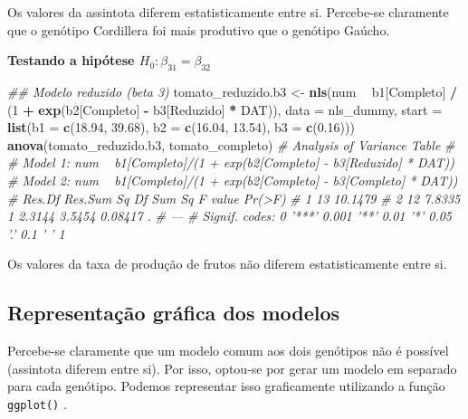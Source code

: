 \documentclass[
]{book}
\newenvironment{Shaded}{\begin{snugshade}}{\end{snugshade}}
\newcommand{\CommentTok}[1]{\textcolor[rgb]{0.56,0.35,0.01}{\textit{#1}}}
\newcommand{\DataTypeTok}[1]{\textcolor[rgb]{0.13,0.29,0.53}{#1}}
\newcommand{\DecValTok}[1]{\textcolor[rgb]{0.00,0.00,0.81}{#1}}
\newcommand{\FloatTok}[1]{\textcolor[rgb]{0.00,0.00,0.81}{#1}}
\newcommand{\KeywordTok}[1]{\textcolor[rgb]{0.13,0.29,0.53}{\textbf{#1}}}
\newcommand{\NormalTok}[1]{#1}
\newcommand{\OperatorTok}[1]{\textcolor[rgb]{0.81,0.36,0.00}{\textbf{#1}}}
\newcommand{\StringTok}[1]{\textcolor[rgb]{0.31,0.60,0.02}{#1}}
\begin{document}
Os valores da assintota diferem estatisticamente entre si. Percebe-se claramente que o genótipo Cordillera foi mais produtivo que o genótipo Gaúcho.

\textbf{Testando a hipótese \(H_0:\beta_{31} = \beta_{32}\)}

\begin{Shaded}
\begin{Highlighting}[]
\CommentTok{## Modelo reduzido (beta 3)}
\NormalTok{tomato_reduzido.b3 <-}\StringTok{ }
\StringTok{  }\KeywordTok{nls}\NormalTok{(num }\OperatorTok{~}\StringTok{ }\NormalTok{b1[Completo] }\OperatorTok{/}\StringTok{ }\NormalTok{(}\DecValTok{1} \OperatorTok{+}\StringTok{ }\KeywordTok{exp}\NormalTok{(b2[Completo] }\OperatorTok{-}\StringTok{ }\NormalTok{b3[Reduzido] }\OperatorTok{*}\StringTok{ }\NormalTok{DAT)), }
      \DataTypeTok{data =}\NormalTok{ nls_dummy,}
      \DataTypeTok{start =} \KeywordTok{list}\NormalTok{(}\DataTypeTok{b1 =} \KeywordTok{c}\NormalTok{(}\FloatTok{18.94}\NormalTok{, }\FloatTok{39.68}\NormalTok{),}
                   \DataTypeTok{b2 =} \KeywordTok{c}\NormalTok{(}\FloatTok{16.04}\NormalTok{, }\FloatTok{13.54}\NormalTok{),}
                   \DataTypeTok{b3 =} \KeywordTok{c}\NormalTok{(}\FloatTok{0.16}\NormalTok{)))}
\KeywordTok{anova}\NormalTok{(tomato_reduzido.b3, tomato_completo)}
\CommentTok{# Analysis of Variance Table}
\CommentTok{# }
\CommentTok{# Model 1: num ~ b1[Completo]/(1 + exp(b2[Completo] - b3[Reduzido] * DAT))}
\CommentTok{# Model 2: num ~ b1[Completo]/(1 + exp(b2[Completo] - b3[Completo] * DAT))}
\CommentTok{#   Res.Df Res.Sum Sq Df Sum Sq F value  Pr(>F)  }
\CommentTok{# 1     13    10.1479                            }
\CommentTok{# 2     12     7.8335  1 2.3144  3.5454 0.08417 .}
\CommentTok{# ---}
\CommentTok{# Signif. codes:  0 '***' 0.001 '**' 0.01 '*' 0.05 '.' 0.1 ' ' 1}
\end{Highlighting}
\end{Shaded}

Os valores da taxa de produção de frutos não diferem estatisticamente entre si.

\hypertarget{representauxe7uxe3o-gruxe1fica-dos-modelos}{%
\subsection{Representação gráfica dos modelos}\label{representauxe7uxe3o-gruxe1fica-dos-modelos}}

Percebe-se claramente que um modelo comum aos dois genótipos não é possível (assintota diferem entre si). Por isso, optou-se por gerar um modelo em separado para cada genótipo. Podemos representar isso graficamente utilizando a função \texttt{ggplot()}  .
\end{document}
